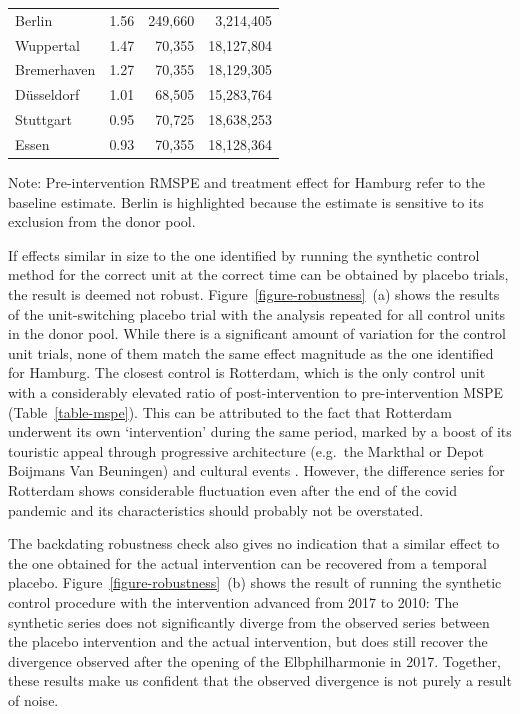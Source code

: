 \documentclass[a4paper, 12pt]{article}
\begin{document}
\begin{table}[htbp]
\begin{tabular}{lrrr}
    Berlin      & 1.56  & 249,660 & 3,214,405  \\
    Wuppertal   & 1.47  & 70,355  & 18,127,804 \\
    Bremerhaven & 1.27  & 70,355  & 18,129,305 \\
    Düsseldorf  & 1.01  & 68,505  & 15,283,764 \\
    Stuttgart   & 0.95  & 70,725  & 18,638,253 \\
    Essen       & 0.93  & 70,355  & 18,128,364 \\
    \bottomrule
  \end{tabular}
  \smallskip
  \begin{minipage}{\linewidth}
    \small Note: Pre-intervention RMSPE and treatment effect for Hamburg refer to the baseline estimate. Berlin is highlighted because the estimate is sensitive to its exclusion from the donor pool.
  \end{minipage}
\end{table}

If effects similar in size to the one identified by running the synthetic control method for the correct unit at the correct time can be obtained by placebo trials, the result is deemed not robust. Figure~\ref{figure-robustness}~(a) shows the results of the unit-switching placebo trial with the analysis repeated for all control units in the donor pool. While there is a significant amount of variation for the control unit trials, none of them match the same effect magnitude as the one identified for Hamburg. The closest control is Rotterdam, which is the only control unit with a considerably elevated ratio of post-intervention to pre-intervention MSPE (Table~\ref{table-mspe}). This can be attributed to the fact that Rotterdam underwent its own `intervention' during the same period, marked by a boost of its touristic appeal through progressive architecture (e.g.\ the Markthal or Depot Boijmans Van Beuningen) and cultural events \citep{nientied2021}. However, the difference series for Rotterdam shows considerable fluctuation even after the end of the covid pandemic and its characteristics should probably not be overstated.

The backdating robustness check also gives no indication that a similar effect to the one obtained for the actual intervention can be recovered from a temporal placebo. Figure~\ref{figure-robustness}~(b) shows the result of running the synthetic control procedure with the intervention advanced from 2017 to 2010: The synthetic series does not significantly diverge from the observed series between the placebo intervention and the actual intervention, but does still recover the divergence observed after the opening of the Elbphilharmonie in 2017. Together, these results make us confident that the observed divergence is not purely a result of noise.
\end{document}
